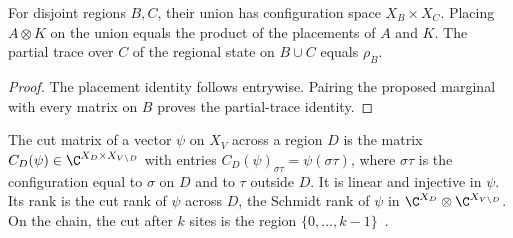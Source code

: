 \begin{lemma}
    \label{lem:sites-regional-union}
    \leanok
    For disjoint regions $B,C$, their union has configuration space
    $X_B\times X_C$. Placing $A\otimes K$ on the union equals the product
    of the placements of $A$ and $K$. The partial trace over $C$ of the
    regional state on $B\cup C$ equals $\rho_B$.
\end{lemma}
\begin{proof}
    \leanok
    The placement identity follows entrywise. Pairing the proposed marginal
    with every matrix on $B$ proves the partial-trace identity.
\end{proof}

\begin{definition}
    \label{def:sites_cut_matrix}
    \leanok
    The cut matrix of a vector $\psi$ on $X_V$ across a region $D$ is the matrix
    $C_D(\psi)\in\C^{X_D\times X_{V\setminus D}}$ with entries
    $C_D(\psi)_{\sigma\tau}=\psi(\sigma\tau)$, where $\sigma\tau$ is the
    configuration equal to $\sigma$ on $D$ and to $\tau$ outside $D$. It is linear and
    injective in $\psi$. Its rank is the cut rank of $\psi$ across $D$, the Schmidt rank
    of $\psi$ in $\C^{X_D}\otimes\C^{X_{V\setminus D}}$. On the chain, the cut after
    $k$ sites is the region $\{0,\dots,k-1\}$~\cite{PerezGarcia2007Matrix}.
\end{definition}

